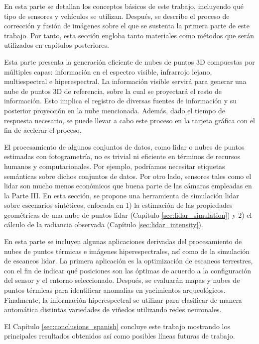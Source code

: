 \small \textbf{} \normalsize\hspace{\partSpacing} En esta parte se detallan los conceptos básicos de este trabajo, incluyendo qué tipo de sensores y vehículos se utilizan. Después, se describe el proceso de corrección y fusión de imágenes sobre el que se sustenta la primera parte de este trabajo. Por tanto, esta sección engloba tanto materiales como métodos que serán utilizados en capítulos posteriores.

\small \textbf{} \normalsize\hspace{\partSpacing} Esta parte presenta la generación eficiente de nubes de puntos 3D compuestas por múltiples capas: información en el espectro visible, infrarrojo lejano, multiespectral e hiperespectral. La información visible servirá para generar una nube de puntos 3D de referencia, sobre la cual se proyectará el resto de información. Esto implica el registro de diversas fuentes de información y su posterior proyección en la nube mencionada. Además, dado el tiempo de respuesta necesario, se puede llevar a cabo este proceso en la tarjeta gráfica con el fin de acelerar el proceso. 

\small \textbf{} \normalsize\hspace{\partSpacing} El procesamiento de algunos conjuntos de datos, como \acrshort{lidar} o nubes de puntos estimadas con fotogrametría, no es trivial ni eficiente en términos de recursos humanos y computacionales. Por ejemplo, podríamos necesitar etiquetas semánticas sobre dichos conjuntos de datos. Por otro lado, sensores tales como el \acrshort{lidar} son mucho menos económicos que buena parte de las cámaras empleadas en la Parte III. En esta sección, se propone una herramienta de simulación \acrshort{lidar} sobre escenarios sintéticos, enfocada en 1) la estimación de las propiedades geométricas de una nube de puntos \acrshort{lidar} (Capítulo \ref{sec:lidar_simulation}) y 2) el cálculo de la radiancia observada (Capítulo \ref{sec:lidar_intensity}). 

\small \textbf{} \normalsize\hspace{\partSpacing} En esta parte se incluyen algunas aplicaciones derivadas del procesamiento de nubes de puntos térmicas e imágenes hiperespectrales, así como de la simulación de escaneos \acrshort{lidar}. La primera aplicación es la optimización de escaneos terrestres, con el fin de indicar qué posiciones son las óptimas de acuerdo a la configuración del sensor y el entorno seleccionado. Después, se evaluarán mapas y nubes de puntos térmicas para identificar anomalías en yacimientos arqueológicos. Finalmente, la información hiperespectral se utilizar para clasificar de manera automática distintas variedades de viñedos utilizando redes neuronales.

\small \textbf{} \normalsize\hspace{3mm} El Capítulo \ref{sec:conclusions_spanish} concluye este trabajo mostrando los principales resultados obtenidos así como posibles líneas futuras de trabajo.